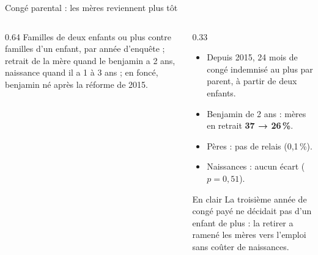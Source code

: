 \documentclass[10pt,aspectratio=169]{beamer}
\begin{document}
\begin{frame}{Congé parental : les mères reviennent plus tôt}
\begin{columns}[T]
\begin{column}{0.64\textwidth}
      \vspace{0.1cm}
      \scriptsize\RaggedRight Familles de deux enfants ou plus contre familles d'un enfant, par année d'enquête ; retrait de la mère quand le benjamin a 2 ans, naissance quand il a 1 à 3 ans ; en foncé, benjamin né après la réforme de 2015.
    \end{column}
    \begin{column}{0.33\textwidth}
      \footnotesize
      \begin{itemize}\setlength{\itemsep}{0.3em}
        \item Depuis 2015, 24 mois de congé indemnisé au plus par parent, à partir de deux enfants.
        \item Benjamin de 2 ans : mères en retrait \textbf{37 → 26\,\%}.
        \item Pères : pas de relais (0,1\,\%).
        \item Naissances : aucun écart ($p = 0{,}51$).
      \end{itemize}
      \begin{callout}{En clair}
        \scriptsize\RaggedRight La troisième année de congé payé ne décidait pas d'un enfant de plus : la retirer a ramené les mères vers l'emploi sans coûter de naissances.
      \end{callout}
    \end{column}
  \end{columns}
\end{frame}
\end{document}
